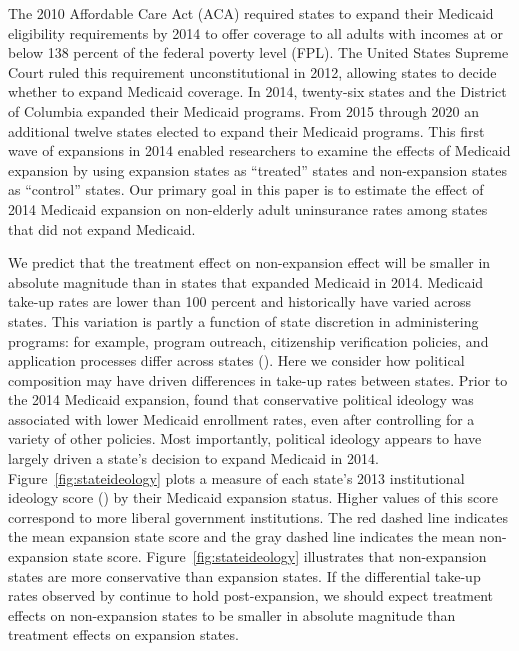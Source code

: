 \documentclass{article}
\begin{document}
The 2010 Affordable Care Act (ACA) required states to expand their Medicaid eligibility requirements by 2014 to offer coverage to all adults with incomes at or below 138 percent of the federal poverty level (FPL). The United States Supreme Court ruled this requirement unconstitutional in 2012, allowing states to decide whether to expand Medicaid coverage. In 2014, twenty-six states and the District of Columbia expanded their Medicaid programs. From 2015 through 2020 an additional twelve states elected to expand their Medicaid programs. This first wave of expansions in 2014 enabled researchers to examine the effects of Medicaid expansion by using expansion states as ``treated'' states and non-expansion states as ``control'' states. Our primary goal in this paper is to estimate the effect of 2014 Medicaid expansion on non-elderly adult uninsurance rates among states that did not expand Medicaid.

We predict that the treatment effect on non-expansion effect will be smaller in absolute magnitude than in states that expanded Medicaid in 2014. Medicaid take-up rates are lower than 100 percent and historically have varied across states. This variation is partly a function of state discretion in administering programs: for example, program outreach, citizenship verification policies, and application processes differ across states (\cite{courtemanche2017early}). Here we consider how political composition may have driven differences in take-up rates between states. Prior to the 2014 Medicaid expansion, \cite{sommers2012understanding} found that conservative political ideology was associated with lower Medicaid enrollment rates, even after controlling for a variety of other policies. Most importantly, political ideology appears to have largely driven a state's decision to expand Medicaid in 2014. Figure~\ref{fig:stateideology} plots a measure of each state's 2013 institutional ideology score (\cite{berry1998measuring}) by their Medicaid expansion status. Higher values of this score correspond to more liberal government institutions. The red dashed line indicates the mean expansion state score and the gray dashed line indicates the mean non-expansion state score. Figure~\ref{fig:stateideology} illustrates that non-expansion states are more conservative than expansion states. If the differential take-up rates observed by \cite{sommers2012understanding} continue to hold post-expansion, we should expect treatment effects on non-expansion states to be smaller in absolute magnitude than treatment effects on expansion states. 
\end{document}
